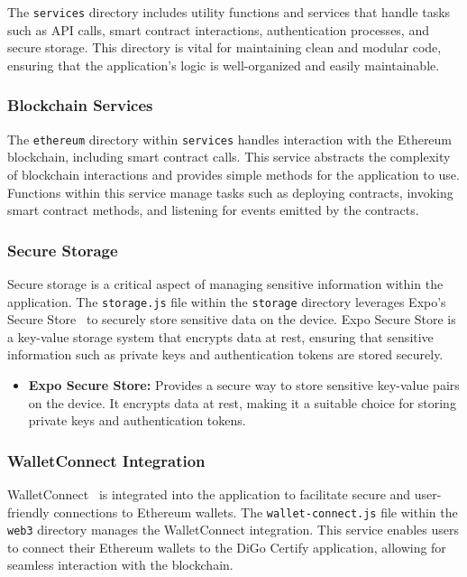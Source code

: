 The \texttt{services} directory includes utility functions and services that handle tasks such as API calls, smart contract interactions, authentication processes, and secure storage. This directory is vital for maintaining clean and modular code, ensuring that the application's logic is well-organized and easily maintainable.

\subsubsection{Blockchain Services}

The \texttt{ethereum} directory within \texttt{services} handles interaction with the Ethereum blockchain, including smart contract calls. This service abstracts the complexity of blockchain interactions and provides simple methods for the application to use. Functions within this service manage tasks such as deploying contracts, invoking smart contract methods, and listening for events emitted by the contracts.

\subsubsection{Secure Storage}

Secure storage is a critical aspect of managing sensitive information within the application. The \texttt{storage.js} file within the \texttt{storage} directory leverages Expo's Secure Store~\cite{Expo-Secure-Store} to securely store sensitive data on the device. Expo Secure Store is a key-value storage system that encrypts data at rest, ensuring that sensitive information such as private keys and authentication tokens are stored securely.

\begin{itemize}
    \item \textbf{Expo Secure Store:} Provides a secure way to store sensitive key-value pairs on the device. It encrypts data at rest, making it a suitable choice for storing private keys and authentication tokens.
\end{itemize}

\subsubsection{WalletConnect Integration}

WalletConnect~\cite{Wallet-Connect} is integrated into the application to facilitate secure and user-friendly connections to Ethereum wallets. The \texttt{wallet-connect.js} file within the \texttt{web3} directory manages the WalletConnect integration. This service enables users to connect their Ethereum wallets to the DiGo Certify application, allowing for seamless interaction with the blockchain.

